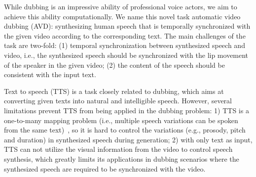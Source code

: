 \documentclass{article}
\begin{document}

While dubbing is an impressive ability of professional voice actors, we aim to achieve this ability computationally. We name this novel task automatic video dubbing (AVD): synthesizing human speech that is temporally synchronized with the given video according to the corresponding text. The main challenges of the task are two-fold: (1) temporal synchronization between synthesized speech and video, i.e., the synthesized speech should be synchronized with the lip movement of the speaker in the given video; (2) the content of the speech should be consistent with the input text.


Text to speech (TTS) is a task closely related to dubbing, which aims at converting given texts into natural and intelligible speech.
However, several limitations prevent TTS from being applied in the dubbing problem: 1) TTS is a one-to-many mapping problem (i.e., multiple speech variations can be spoken from the same text)~\cite{ren2021fastspeech}, so it is hard to control the variations (e.g., prosody, pitch and duration) in synthesized speech during generation; 2) with only text as input, TTS can not utilize the visual information from the video to control speech synthesis, which greatly limits its applications in dubbing scenarios where the synthesized speech are required to be synchronized with the video. 
\end{document}
